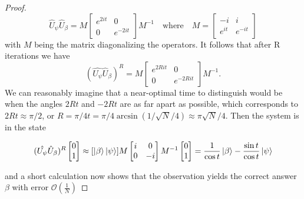 \begin{proof}
\begin{equation*}
    \hat{U}_\psi\hat{U}_\beta = M  \begin{bmatrix}
    e^{2it} & 0 \\
    0 & e^{-2it}
    \end{bmatrix}  M^{-1} \quad \text{where} \quad M = \begin{bmatrix}
    -i & i \\
    e^{it} & e^{-it}
    \end{bmatrix}
  \end{equation*}
 with $M$ being the matrix diagonalizing the operators. It follows that after R iterations we have
\begin{equation*}
    (\hat{U_\psi}\hat{U}_\beta)^R = M  \begin{bmatrix}
    e^{2Rit} & 0 \\
    0 & e^{-2Rit}
    \end{bmatrix}  M^{-1}.
\end{equation*}
We can reasonably imagine that a near-optimal time to distinguish would be when the angles $2Rt$ and $-2Rt$ are as far apart as possible, which corresponds to $2Rt \approx \pi/2$, or $R=\pi/4t = \pi/4\arcsin(1/\sqrt{N}/4) \approx \pi \sqrt{N}/4$. Then the system is in the state

\begin{equation*}
    [\ket{\beta} \ket{\psi}]
     (\hat{U_\psi}\hat{U}_\beta)^R \begin{bmatrix}
     0 \\ 1
     \end{bmatrix} \approx 
      [\ket{\beta} \ket{\psi}] M\begin{bmatrix}
      i & 0 \\
      0 & -i
      \end{bmatrix} M^{-1}\begin{bmatrix}
     0 \\ 1
     \end{bmatrix}
    =
    \frac{1}{\cos t}\ket{\beta} - \frac{\sin t}{\cos t}\ket{\psi}
\end{equation*}

and a short calculation now shows that the observation yields the correct answer $\beta$ with error $\mathcal{O}(\frac{1}{N})$
\end{proof}